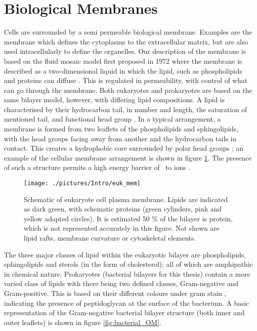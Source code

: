 \newpage

\section{Biological Membranes}

Cells are surrounded by a semi permeable biological membrane. Examples are the membrane which defines the cytoplasms to the extracellular matrix, but are also used intracellularly to define the organelles. Our description of the membrane is based on the fluid mosaic model first proposed in 1972 where the membrane is described as a two-dimensional liquid in which the lipid, such as phospholipids and proteins can diffuse \cite{Singer1972}.  This is regulated in permeability, with control of what can go through the membrane. Both eukaryotes and prokaryotes are based on the same bilayer model, however, with differing lipid compositions. A lipid is characterised by their hydrocarbon tail, in number and length, the saturation of mentioned tail, and functional head group \cite{Luckey2008}. In a typical arrangement, a membrane is formed from two leaflets of the phospholipids and sphingolipids, with the head groups facing away from another and the hydrocarbon tails in contact. This creates a hydrophobic core surrounded by polar head groups \cite{Wiener1991}; an example of the cellular membrane arrangement is shown in figure \ref{fig:euk_mem}. The presence of such a structure permits a high energy barrier of  \kj\ to ions \cite{Parsegian1969}.

\begin{figure}[H]
\begin{center}
\texttt{[image: ./pictures/Intro/euk\_mem]}
\caption[Schematic of eukaryote cell plasma membrane.] {Schematic of eukaryote cell plasma membrane. Lipids are indicated as dark green, with schematic proteins (green cylinders, pink and yellow adapted circles).  It is estimated 50 \% of the bilayer is protein, which is not represented accurately in this figure. Not shown are lipid rafts, membrane curvature or cytoskeletal elements.}
\label{fig:euk_mem}
\end{center}
\end{figure}

The three major classes of lipid within the eukaryotic bilayer are phospholipids, sphingolipids and sterols (in the form of cholesterol); all of which are amphipathic in chemical nature. Prokaryotes (bacterial bilayers for this thesis) contain a more varied class of lipids with there being two defined classes, Gram-negative and Gram-positive. This is based on their different colours under gram stain \cite{Gram1884}, indicating the presence of peptidoglycan at the surface of the bacterium. A basic representation of the Gram-negative bacterial bilayer structure (both inner and outer leaflets) is shown in figure \ref{fig:bacterial_OM}.

